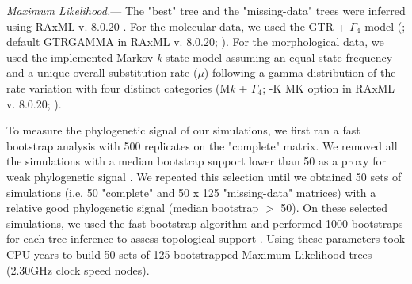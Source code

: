 \documentclass[12pt,letterpaper]{article}
\renewcommand{\subsubsection}[1]{%
\vspace{2ex}
\noindent
\textit{#1.}---}
\begin{document}
\subsubsection{Maximum Likelihood}
The "best" tree and the "missing-data" trees were inferred using RAxML v. 8.0.20 \citep{Stamatakis21012014}. For the molecular data, we used the GTR + $\Gamma_4$ model (\citealt{tavare1986}; default GTRGAMMA in RAxML v. 8.0.20; \citealt{Stamatakis21012014}).%
For the morphological data, we used the implemented Markov \textit{k} state model \citep{lewisa2001} %
 assuming an equal state frequency and a unique overall substitution rate ($\mu$) following a gamma distribution of the rate variation with four distinct categories (M\textit{k} + $\Gamma_4$; -K MK option in RAxML v. 8.0.20; \citealt{Stamatakis21012014}).

To measure the phylogenetic signal of our simulations, we first ran a fast bootstrap analysis with 500 replicates on the "complete" matrix. We removed all the simulations with a median bootstrap support lower than 50 as a proxy for weak phylogenetic signal \citep{zanderminimal2004}. We repeated this selection until we obtained 50 sets of simulations (i.e. 50 "complete" and 50 x 125 "missing-data" matrices) with a relative good phylogenetic signal (median bootstrap $>$ 50). On these selected simulations, we used the fast bootstrap algorithm and performed 1000 bootstraps for each tree inference to assess topological support \citep{pattengale2010many}.
Using these parameters took  CPU years to build 50 sets of 125 bootstrapped Maximum Likelihood trees (2.30GHz clock speed nodes).
\end{document}
